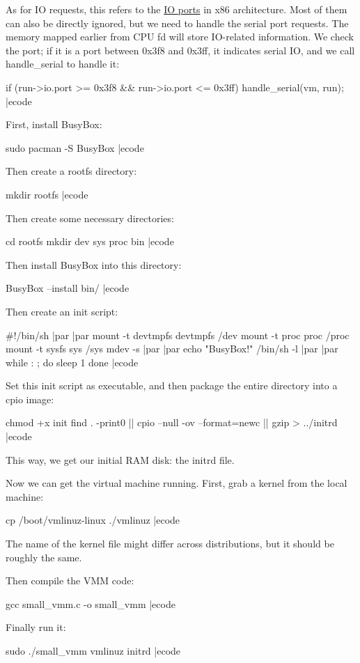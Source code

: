 As for  IO requests, this refers to the  \href{https://wiki.osdev.org/I/O_Ports}{IO ports} in x86 architecture. Most of them can also be directly ignored, but we need to handle the serial port requests. The memory mapped earlier from CPU fd will store  IO-related information. We check the port; if it is a port between  0x3f8 and  0x3ff, it indicates serial  IO, and we call  {\itt handle\_serial} to handle it:

\bcode
if (run->io.port >= 0x3f8 && run->io.port <= 0x3ff) {
    handle_serial(vm, run);
}
|ecode


First, install  BusyBox:

\bcode
sudo pacman -S BusyBox
|ecode

Then create a  rootfs directory:

\bcode
mkdir rootfs
|ecode

Then create some necessary directories:

\bcode
cd rootfs
mkdir dev sys proc bin
|ecode

Then install  BusyBox into this directory:

\bcode
BusyBox --install bin/
|ecode

Then create an  init script:

\bcode
#!/bin/sh
|par |par
mount -t devtmpfs devtmpfs /dev
mount -t proc proc /proc
mount -t sysfs sys /sys
mdev -s
|par |par
echo "BusyBox!"
/bin/sh -l
|par |par
while : ; do
    sleep 1
done
|ecode

Set this  init script as executable, and then package the entire directory into a  cpio image:

\bcode
chmod +x init
find . -print0 || cpio --null -ov --format=newc || gzip > ../initrd
|ecode

This way, we get our initial RAM disk: the initrd file.


Now we can get the virtual machine running. First, grab a kernel from the local machine:

\bcode
cp /boot/vmlinuz-linux ./vmlinuz
|ecode

The name of the kernel file might differ across distributions, but it should be roughly the same.

Then compile the VMM code:

\bcode
gcc small_vmm.c -o small_vmm
|ecode

Finally run it:

\bcode
sudo ./small_vmm vmlinuz initrd
|ecode

